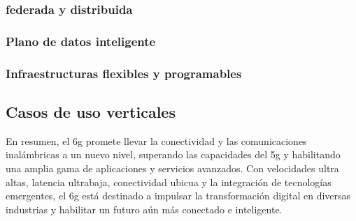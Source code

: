 \subsubsection{ federada y distribuida}
 
\subsubsection{Plano de datos inteligente}

\subsubsection{Infraestructuras flexibles y programables }
   



\subsection{Casos de uso verticales}



En resumen, el \gls{6g} promete llevar la conectividad y las comunicaciones inalámbricas a un nuevo nivel, superando las capacidades del \gls{5g} y habilitando una amplia gama de aplicaciones y servicios avanzados. Con velocidades ultra altas, latencia ultrabaja, conectividad ubicua y la integración de tecnologías emergentes, el \gls{6g} está destinado a impulsar la transformación digital en diversas industrias y habilitar un futuro aún más conectado e inteligente.

